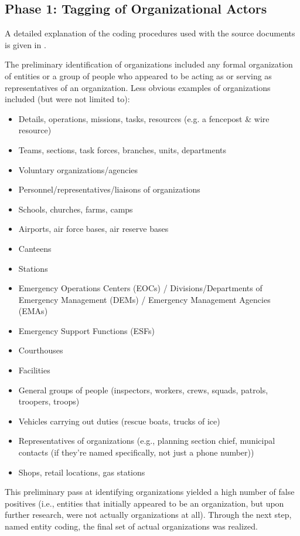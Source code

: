 \documentclass[11pt]{article}
\begin{document}
\subsection{Phase 1: Tagging of Organizational Actors}
A detailed explanation of the coding procedures used with the source documents is given in \citet{butts.acton.marcum:2010a}.

The preliminary identification of organizations included any formal organization of entities or a group of people who appeared to be acting as or serving as representatives of an organization.  Less obvious examples of organizations included (but were not limited to):
\begin{itemize}
\item Details, operations, missions, tasks, resources (e.g. a fencepost \& wire resource)
\item Teams, sections, task forces, branches, units, departments
\item Voluntary organizations/agencies
\item Personnel/representatives/liaisons of organizations
\item Schools, churches, farms, camps
\item Airports, air force bases, air reserve bases
\item Canteens
\item Stations
\item Emergency Operations Centers (EOCs) / Divisions/Departments of Emergency Management (DEMs) / Emergency Management Agencies (EMAs)
\item Emergency Support Functions (ESFs)
\item Courthouses
\item Facilities
\item General groups of people (inspectors, workers, crews, squads, patrols, troopers, troops)
\item Vehicles carrying out duties (rescue boats, trucks of ice)
\item Representatives of organizations (e.g., planning section chief, municipal contacts (if they're named specifically, not just a phone number))
\item Shops, retail locations, gas stations
\end{itemize}

This preliminary pass at identifying organizations yielded a high number of false positives (i.e., entities that initially appeared to be an organization, but upon further research, were not actually organizations at all).  Through the next step, named entity coding, the final set of actual organizations was realized.
\end{document}
